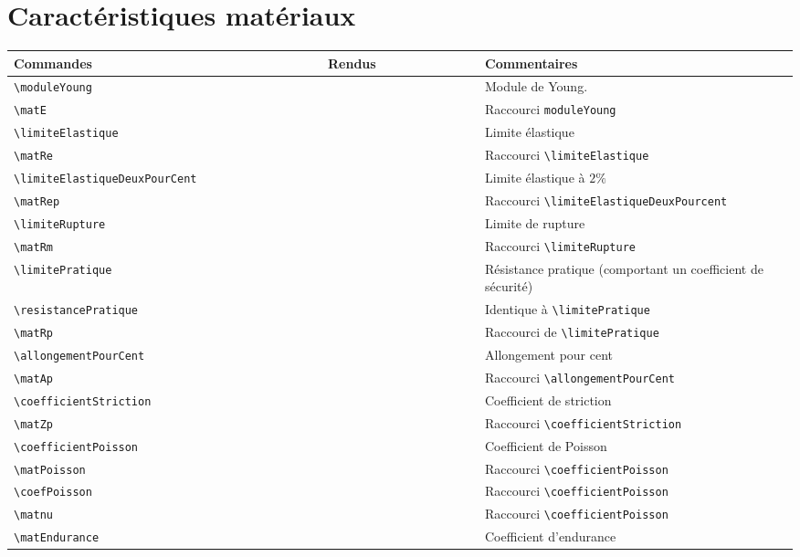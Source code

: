 \documentclass[a4paper,12pt]{article}
\begin{document}
	\section{Caractéristiques matériaux}
		\noindent
		\begin{tabular}{|p{0.4\linewidth}|p{0.2\linewidth}|p{0.4\linewidth}|}
			\hline
				\textbf{Commandes}&\textbf{Rendus}&\textbf{Commentaires}
			\\\hline\hline
				\verb!\moduleYoung!	&	\moduleYoung	&	Module de Young.
			\\\hline
				\verb!\matE!		&	\matE		&	Raccourci \verb!moduleYoung!
			\\\hline
				\verb!\limiteElastique!	&	\limiteElastique&	Limite élastique
			\\\hline
				\verb!\matRe!		&	\matRe		&	Raccourci \verb!\limiteElastique!
			\\\hline
				{\small \verb!\limiteElastiqueDeuxPourCent!}	&	\limiteElastiqueDeuxPourCent	&	Limite élastique à $2\%$
			\\\hline
				\verb!\matRep!		&	\matRep		&	Raccourci {\small\verb!\limiteElastiqueDeuxPourcent!}
			\\\hline
				\verb!\limiteRupture!	&	\limiteRupture	&	Limite de rupture
			\\\hline
				\verb!\matRm!		&	\matRm		&	Raccourci \verb!\limiteRupture!
			\\\hline
				\verb!\limitePratique!		&	\limitePratique		&	Résistance pratique (comportant un coefficient de sécurité)
			\\\hline
				\verb!\resistancePratique!		&	\resistancePratique		&	Identique à \verb!\limitePratique!
			\\\hline
				\verb!\matRp!		&	\matRp		&	Raccourci de \verb!\limitePratique!
			\\\hline
				\verb!\allongementPourCent!&	\allongementPourCent	&	Allongement pour cent
			\\\hline
				\verb!\matAp!		&	\matAp		&	Raccourci \verb!\allongementPourCent!
			\\\hline
				\verb!\coefficientStriction!&	\coefficientStriction	&	Coefficient de striction
			\\\hline
				\verb!\matZp!		&	\matZp		&	Raccourci \verb!\coefficientStriction!
			\\\hline
				\verb!\coefficientPoisson!&	\coefficientPoisson	&	Coefficient de Poisson
			\\\hline
				\verb!\matPoisson!	&	\matPoisson		&	Raccourci \verb!\coefficientPoisson!
			\\\hline
				\verb!\coefPoisson!	&	\coefPoisson		&	Raccourci \verb!\coefficientPoisson!
			\\\hline
				\verb!\matnu!		&	\matnu		&	Raccourci \verb!\coefficientPoisson!
			\\\hline
				\verb!\matEndurance!	&	\matEndurance		&	Coefficient d'endurance
			\\\hline
		\end{tabular}
\end{document}
